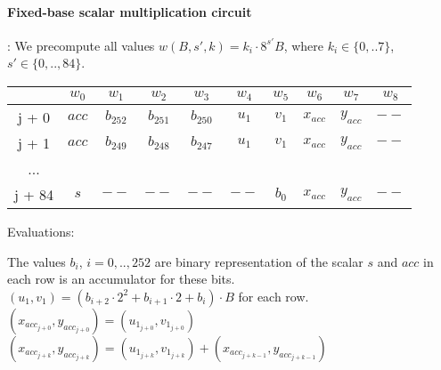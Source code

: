 \paragraph{Fixed-base scalar multiplication circuit}:
We precompute all values $w(B,s',k) = k_i \cdot 8^{s'} B$, where $k_i \in \{ 0,..7 \}$, $s' \in \{0,.., 84\}$.
\begin{center}
    \begin{tabular}{ c|c|c|c|c|c|c|c|c|c }
        & $w_0$  & $w_1$  & $w_2$  & $w_3$  & $w_4$  & $w_5$ & $w_6$ & $w_7$ & $w_8$  \\
        \hline
        j + 0  & $acc$  & $b_{252}$ & $b_{251}$ & $b_{250}$ & $u_1$ & $v_1$ & $x_{acc}$ & $y_{acc}$ & $--$   \\
        j + 1  & $acc$  & $b_{249}$ & $b_{248}$ & $b_{247}$ & $u_1$ & $v_1$ & $x_{acc}$ & $y_{acc}$ & $--$   \\
        ...    &             &             &             &             &      & & & &  \\
        j + 84 & $s$  & $--$ & $--$ & $--$ & $--$ & $b_{0}$ & $x_{acc}$ & $y_{acc}$ & $--$   \\
    \end{tabular}
\end{center}
Evaluations:
\begin{center}
The values $b_i$, $i = 0,.., 252$ are binary representation of the scalar $s$ and $acc$ in each row is an accumulator for these bits.\\
$(u_1, v_1) = (b_{i + 2} \cdot 2^2 + b_{i + 1}\cdot 2 + b_i) \cdot B$ for each row.\\
 $(x_{acc_{j + 0}}, y_{acc_{j + 0}}) = (u_{1_{j + 0}}, v_{1_{j + 0}}) $ \\
 $(x_{acc_{j + k}}, y_{acc_{j + k}}) = (u_{1_{j + k}}, v_{1_{j + k}}) + (x_{acc_{j + k - 1}}, y_{acc_{j + k - 1}}) $ \\
\end{center}

